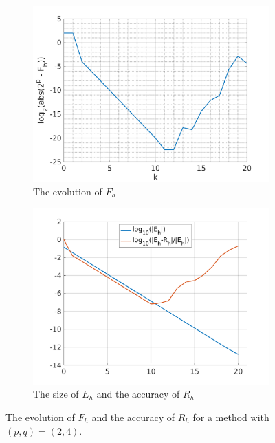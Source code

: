 \documentclass[runningheads]{llncs}
\begin{document}
\begin{figure}[h]
\begin{subfigure}[h]{0.49\linewidth}
\includegraphics[width=\linewidth]{rint_mwe1a.png}
\caption{The evolution of $F_h$} \label{fig:rint_mwe1a}
\end{subfigure}
\hfill
\begin{subfigure}[h]{0.49\linewidth}
\includegraphics[width=\linewidth]{rint_mwe1b.png}
\caption{The size of $E_h$ and the accuracy of $R_h$} \label{fig:rint_mwe1b}
\end{subfigure}%
\caption{The evolution of $F_h$ and the accuracy of $R_h$ for a method with $(p,q) = (2,4)$.}
\end{figure}
\end{document}
